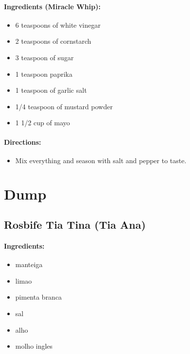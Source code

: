 \documentclass{article}
\begin{document}
\paragraph{Ingredients (Miracle Whip):}

\begin{itemize}
	\item 6 teaspoons of white vinegar 
	\item 2 teaspoons of cornstarch 
	\item 3 teaspoon of sugar 
	\item 1 teaspoon paprika 
	\item 1 teaspoon of garlic salt 
	\item 1/4 teaspoon of mustard powder 
	\item 1 1/2 cup of mayo
\end{itemize}

\paragraph{Directions:}
\begin{itemize}
	\item Mix everything and season with salt and pepper to taste.
\end{itemize}

\section{Dump}


\subsection{Rosbife Tia Tina (Tia Ana)}

\paragraph{Ingredients:}

\begin{itemize}
	\item manteiga
	\item limao
	\item pimenta branca
	\item sal
	\item alho
	\item molho ingles
\end{itemize}
\end{document}
